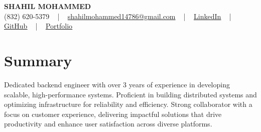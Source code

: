 \documentclass[letterpaper,10pt]{article}
\begin{document}
\begin{center}
    {\fontsize{14pt}{12pt}\selectfont \textbf{\MakeUppercase{Shahil Mohammed}}}\\ \vspace{2pt}
    \fontsize{10pt}{12pt}\selectfont (832) 620-5379 ~ | ~ \href{mailto:shahilmohammed14786@gmail.com}{shahilmohammed14786@gmail.com} ~ | ~  
    \href{https://www.linkedin.com/in/shahil-mohammed-9652931a1/}{\color{blue}\underline{LinkedIn}}  ~ | ~ 
    \href{https://github.com/freakbeast14}{\color{blue}\underline{GitHub}} ~ | ~ 
    \href{https://shahil-mohammed.netlify.app/}{\color{blue}\underline{Portfolio}}
    \vspace{-8pt}
\end{center}

\section{Summary}
\vspace{-2pt}\fontsize{8pt}{9pt}\selectfont
Dedicated backend engineer with over 3 years of experience in developing scalable, high-performance systems. Proficient in building distributed systems and optimizing infrastructure for reliability and efficiency. Strong collaborator with a focus on customer experience, delivering impactful solutions that drive productivity and enhance user satisfaction across diverse platforms.
 \vspace{-5pt}
 
\vspace{-2pt}
\end{document}
